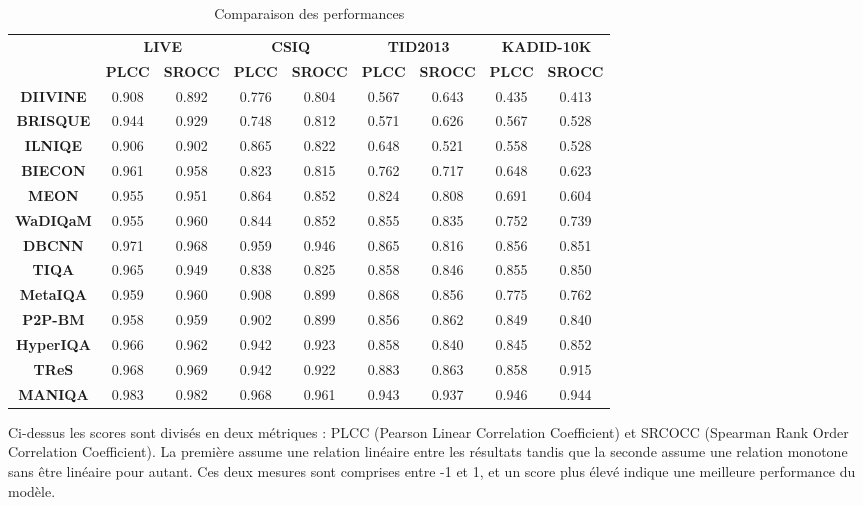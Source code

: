 \documentclass{ieeeaccess}
\begin{document}
\begin{table}[h]
\caption{Comparaison des performances}
\label{table}
\setlength{\tabcolsep}{0.3pt}
\begin{tabular}{|c|c|c|c|c|c|c|c|c|}
    \hline
    \multirow{2}{*}{\textbf{ }} & \multicolumn{2}{c|}{\textbf{LIVE}} & \multicolumn{2}{c|}{\textbf{CSIQ}} & \multicolumn{2}{c|}{\textbf{TID2013}} & \multicolumn{2}{c|}{\textbf{KADID-10K}} \\
    \cline{2-9}
    & \textbf{PLCC} & \textbf{SROCC} & \textbf{PLCC} & \textbf{SROCC} & \textbf{PLCC} & \textbf{SROCC} & \textbf{PLCC} & \textbf{SROCC} \\
    \hline
    \textbf{DIIVINE} & 0.908 & 0.892 & 0.776 & 0.804 & 0.567 & 0.643 & 0.435 & 0.413 \\
    \textbf{BRISQUE} & 0.944 & 0.929 & 0.748 & 0.812 & 0.571 & 0.626 & 0.567 & 0.528 \\
    \textbf{ILNIQE} & 0.906 & 0.902 & 0.865 & 0.822 & 0.648 & 0.521 & 0.558 & 0.528 \\
    \textbf{BIECON} & 0.961 & 0.958 & 0.823 & 0.815 & 0.762 & 0.717 & 0.648 & 0.623 \\
    \textbf{MEON} & 0.955 & 0.951 & 0.864 & 0.852 & 0.824 & 0.808 & 0.691 & 0.604 \\
    \textbf{WaDIQaM} & 0.955 & 0.960 & 0.844 & 0.852 & 0.855 & 0.835 & 0.752 & 0.739 \\
    \textbf{DBCNN} & 0.971 & 0.968 & 0.959 & 0.946 & 0.865 & 0.816 & 0.856 & 0.851 \\
    \textbf{TIQA} & 0.965 & 0.949 & 0.838 & 0.825 & 0.858 & 0.846 & 0.855 & 0.850 \\
    \textbf{MetaIQA} & 0.959 & 0.960 & 0.908 & 0.899 & 0.868 & 0.856 & 0.775 & 0.762 \\
    \textbf{P2P-BM} & 0.958 & 0.959 & 0.902 & 0.899 & 0.856 & 0.862 & 0.849 & 0.840 \\
    \textbf{HyperIQA} & 0.966 & 0.962 & 0.942 & 0.923 & 0.858 & 0.840 & 0.845 & 0.852 \\
    \textbf{TReS} & 0.968 & 0.969 & 0.942 & 0.922 & 0.883 & 0.863 & 0.858 & 0.915 \\
    \textbf{MANIQA} & 0.983 & 0.982 & 0.968 & 0.961 & 0.943 & 0.937 & 0.946 & 0.944 \\
    \hline
\end{tabular}
\end{table}

Ci-dessus les scores sont divisés en deux métriques : PLCC (Pearson Linear Correlation Coefficient) et SRCOCC (Spearman Rank Order Correlation Coefficient). La première assume une relation linéaire entre les résultats tandis que la seconde assume une relation monotone sans être linéaire pour autant. Ces deux mesures sont comprises entre -1 et 1, et un score plus élevé indique une meilleure performance du modèle.  
\end{document}
